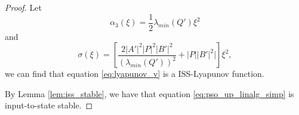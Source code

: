 \begin{proof}
Let
\begin{equation}
\label{eq:proof_alpha3_func}
\alpha_{3} ( \xi )= \frac{1}{2} \lambda_{min}(Q') \xi^{2}
\end{equation}
and
\begin{equation}
\label{eq:proof_sigma_func}
\sigma ( \xi ) = [ \frac{2 | A' |^{2} | P |^{2} | B' |^{2}}{ ( \lambda_{min}(Q') )^{2} } + | P | | B' |^{2} | ] \xi^{2},
\end{equation}
we can find that equation \eqref{eq:lyapunov_v} is a ISS-Lyapunov function.

By Lemma \ref{lem:iss_stable}, we have that equation \eqref{eq:pso_up_linalg_simp} is input-to-state stable.

\end{proof}
